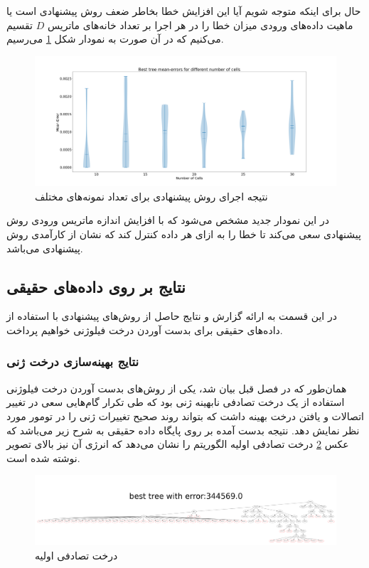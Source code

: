 حال برای اینکه متوجه شویم آیا این افزایش خطا بخاطر ضعف روش پیشنهادی است یا ماهیت داده‌های ورودی میزان خطا را در هر اجرا بر تعداد خانه‌های ماتریس $D$ تقسیم می‌کنیم که در آن صورت به نمودار شکل \ref{fig:sy_n_err_mean} می‌رسیم.
\begin{figure}[!ht]
	\centering
	\includegraphics[width=\textwidth]{img/res/sy_N_Err_mean}
	\caption{‌نتیجه اجرای روش پیشنهادی برای تعداد نمونه‌های مختلف}
	\label{fig:sy_n_err_mean}
\end{figure}
در این نمودار جدید مشخص می‌شود که با افزایش اندازه ماتریس ورودی روش پیشنهادی سعی می‌کند تا خطا را به ازای هر داده کنترل کند که نشان از کارآمدی روش پیشنهادی می‌باشد.

\subsection{نتایج بر روی داده‌های حقیقی}
در این قسمت به ارائه گزارش و نتایج حاصل از روش‌های پیشنهادی با استفاده از داده‌های حقیقی برای بدست آوردن درخت فیلوژنی خواهیم پرداخت.
\subsubsection{نتایج بهینه‌سازی درخت ژنی}
همان‌طور که در فصل قبل بیان شد، یکی از روش‌های بدست آوردن درخت فیلوژنی استفاده از یک درخت تصادفی نابهینه ژنی بود که طی تکرار گام‌هایی سعی در تغییر اتصالات و یافتن درخت بهینه داشت که بتواند روند صحیح تغییرات ژنی را در تومور مورد نظر نمایش دهد.
نتیجه بدست آمده بر روی پایگاه داده حقیقی  به شرح زیر می‌باشد که عکس \ref{fig:sn_initial_T} درخت تصادفی اولیه الگوریتم را نشان می‌دهد که انرژی آن نیز بالای تصویر نوشته شده است.\\
\begin{figure}[!ht]
	\centering
	\includegraphics[width=\textwidth]{img/res/sn_initial_tree}
	\caption{درخت تصادفی اولیه}
	\label{fig:sn_initial_T}
\end{figure}

